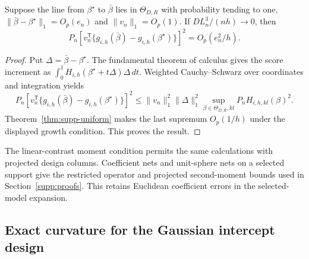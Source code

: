 \begin{proposition}\label{prop:supp-plugin}
Suppose the line from $\beta^\star$ to $\bar\beta$ lies in
$\Theta_{D,R}$ with probability tending to one,
$\|\bar\beta-\beta^\star\|_1=O_p(e_n)$ and $\|v_n\|_1=O_p(1)$.
If $D L_n^3/(nh)\to0$, then
\[
 P_n[v_n^{\mathsf T}\{g_{i,h}(\bar\beta)-g_{i,h}(\beta^\star)\}]^2
 =O_p(e_n^2/h).
\]
\end{proposition}

\begin{proof}
Put $\Delta=\bar\beta-\beta^\star$. The fundamental theorem of
calculus gives the score increment as
$\int_0^1H_{i,h}(\beta^\star+t\Delta)\Delta\,dt$.
Weighted Cauchy--Schwarz over coordinates and integration yields
\[
 P_n[v_n^{\mathsf T}\{g_{i,h}(\bar\beta)-g_{i,h}(\beta^\star)\}]^2
 \leq\|v_n\|_1^2\|\Delta\|_1^2
       \sup_{\beta\in\Theta_{D,R},kl}P_nH_{i,h,kl}(\beta)^2.
\]
Theorem~\ref{thm:supp-uniform} makes the last supremum $O_p(1/h)$
under the displayed growth condition. This proves the result.
\end{proof}

The linear-contrast moment condition permits the same calculations
with projected design columns. Coefficient nets and unit-sphere nets
on a selected support give the restricted operator and projected
second-moment bounds used in Section~\ref{supp:proofs}. This retains
Euclidean coefficient errors in the selected-model expansion.

\subsection{Exact curvature for the Gaussian intercept design}

